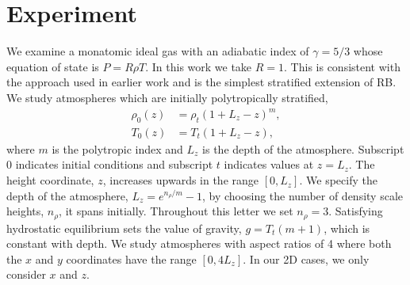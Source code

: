 \documentclass[aps, prl, twocolumn, nofootinbib, groupedaddress, amsfonts, amssymb, amsmath]{revtex4-1}
\begin{document}
\section{Experiment} 
\label{sec:experiment}
We examine a monatomic ideal gas with an adiabatic index of
$\gamma = 5/3$ whose equation of state is $P = R\rho T$. In this
work we take $R = 1$.
This is consistent with the approach used in earlier work \cite{graham1975, chan&all1982,
hurlburt&all1984, cattaneo&all1990, cattaneo&all1991, brummell&all1996} 
and is the simplest stratified extension of RB.
We study atmospheres which are initially polytropically stratified,
\begin{equation}
\begin{split}
\rho_0(z) &= \rho_{t}(1 + L_z - z)^m, \\
T_0(z)    &= T_{t}(1 + L_z - z),
\label{eqn:polytrope}
\end{split}
\end{equation}
where $m$ is the polytropic index and $L_z$ is the depth of the atmosphere.
Subscript 0 indicates initial conditions and subscript $t$ indicates values
at $z = L_z$.
The height coordinate, $z$, increases upwards in the range $[0, L_z]$.  We
specify the depth of the atmosphere, $L_z = e^{n_{\rho}/m} - 1$, by choosing
the number of density scale heights, $n_{\rho}$, it spans initially.
Throughout this letter we set $n_{\rho} = 3$.  Satisfying hydrostatic
equilibrium sets the value of gravity, $g = T_t (m + 1)$, which is
constant with depth.  We study atmospheres with aspect
ratios of 4 where both the $x$ and $y$ coordinates have the range $[0, 4L_z]$.
In our 2D cases, we only consider $x$ and $z$.
\end{document}
